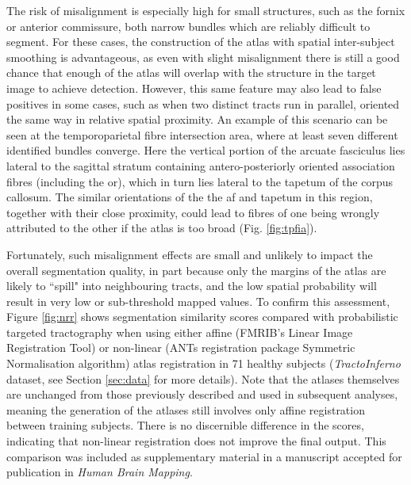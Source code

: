 The risk of misalignment is especially high for small structures, such as the fornix or anterior commissure, both narrow bundles which are reliably difficult to segment.
For these cases, the construction of the atlas with spatial inter-subject smoothing is advantageous, as even with slight misalignment there is still a good chance that enough of the atlas will overlap with the structure in the target image to achieve detection.
However, this same feature may also lead to false positives in some cases, such as when two distinct tracts run in parallel, oriented the same way in relative spatial proximity.
An example of this scenario can be seen at the temporoparietal fibre intersection area, where at least seven different identified bundles converge.\autocite{Martino2013}
Here the vertical portion of the arcuate fasciculus lies lateral to the sagittal stratum containing antero-posteriorly oriented association fibres (including the \gls{or}), which in turn lies lateral to the tapetum of the corpus callosum.
The similar orientations of the the \gls{af} and tapetum in this region, together with their close proximity, could lead to fibres of one being wrongly attributed to the other if the atlas is too broad (Fig. \ref{fig:tpfia}).

\begin{SCfigure}[][h!]
  \captionsetup{format=plain}
  
  \caption{Example of potential for atlas misalignment. The \gls{af} (A) and tapetum (T) are proximal and parallel at the temporoparietal fibre intersection area. Linearly registered right \gls{af} atlas \glspl{tod} may overlap with tapetum (arrowhead).}
  \label{fig:tpfia}
\end{SCfigure}

Fortunately, such misalignment effects are small and unlikely to impact the overall segmentation quality, in part because only the margins of the atlas are likely to ``spill" into neighbouring tracts, and the low spatial probability will result in very low or sub-threshold mapped values.
To confirm this assessment, Figure \ref{fig:nrr} shows segmentation similarity scores compared with probabilistic targeted tractography when using either affine (FMRIB's Linear Image Registration Tool\autocite{Jenkinson2002}) or non-linear (ANTs registration package Symmetric Normalisation algorithm\autocite{Tustison2013,Avants2011}) atlas registration in 71 healthy subjects (\textit{TractoInferno} dataset, see Section \ref{sec:data} for more details).
Note that the atlases themselves are unchanged from those previously described and used in subsequent analyses, meaning the generation of the atlases still involves only affine registration between training subjects.
There is no discernible difference in the scores, indicating that non-linear registration does not improve the final output.
This comparison was included as supplementary material in a manuscript accepted for publication in \textit{Human Brain Mapping}\autocite{Young2024}.


